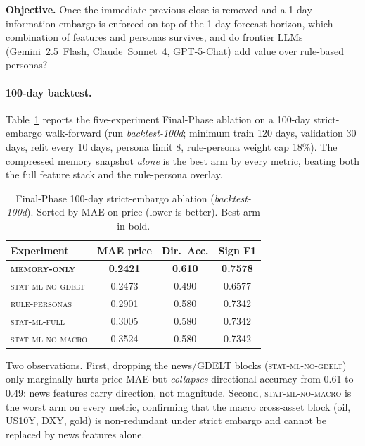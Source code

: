\documentclass[11pt]{article}
\begin{document}
\textbf{Objective.} Once the immediate previous close is removed and a 1-day information embargo is enforced on top of the 1-day forecast horizon, which combination of features and personas survives, and do frontier LLMs (Gemini~2.5~Flash, Claude~Sonnet~4, GPT-5-Chat) add value over rule-based personas?

\paragraph{100-day backtest.}
Table~\ref{tab:fp-100d} reports the five-experiment Final-Phase ablation on a 100-day strict-embargo walk-forward (run \textit{backtest-100d}; minimum train 120 days, validation 30 days, refit every 10 days, persona limit 8, rule-persona weight cap 18\%). The compressed memory snapshot \emph{alone} is the best arm by every metric, beating both the full feature stack and the rule-persona overlay.

\begin{table}[H]
\centering
\begingroup
\setlength{\tabcolsep}{3pt}
\captionsetup{justification=raggedright,singlelinecheck=false}
\small
\caption{Final-Phase 100-day strict-embargo ablation (\textit{backtest-100d}). Sorted by MAE on price (lower is better). Best arm in bold.}
\label{tab:fp-100d}
\begin{tabularx}{\columnwidth}{@{}>{\raggedright\arraybackslash}Xccc@{}}
\toprule
\textbf{Experiment} & \textbf{MAE price} & \textbf{Dir.\ Acc.} & \textbf{Sign F1} \\
\midrule
\textbf{\textsc{memory-only}} & \textbf{0.2421} & \textbf{0.610} & \textbf{0.7578} \\
\textsc{stat-ml-no-gdelt} & 0.2473 & 0.490 & 0.6577 \\
\textsc{rule-personas} & 0.2901 & 0.580 & 0.7342 \\
\textsc{stat-ml-full} & 0.3005 & 0.580 & 0.7342 \\
\textsc{stat-ml-no-macro} & 0.3524 & 0.580 & 0.7342 \\
\bottomrule
\end{tabularx}
\endgroup
\end{table}

Two observations. First, dropping the news/GDELT blocks (\textsc{stat-ml-no-gdelt}) only marginally hurts price MAE but \emph{collapses} directional accuracy from 0.61 to 0.49: news features carry direction, not magnitude. Second, \textsc{stat-ml-no-macro} is the worst arm on every metric, confirming that the macro cross-asset block (oil, US10Y, DXY, gold) is non-redundant under strict embargo and cannot be replaced by news features alone.
\end{document}
